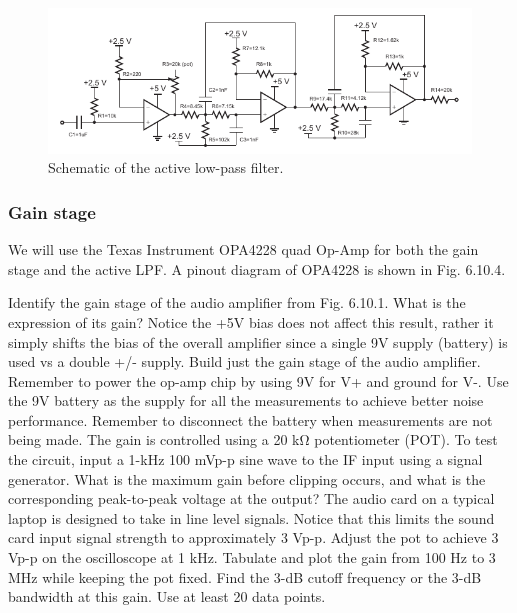 \documentclass[letterpaper, 11pt]{article}
\begin{document}
\begin{figure}
	\centering
	\includegraphics{lpf_sch}
	\caption{Schematic of the active low-pass filter.}
	\label{fig:lpf_pic}
\end{figure}


\subsubsection{Gain stage}

We will use the Texas Instrument OPA4228 quad Op-Amp for both the gain stage and the active LPF. A pinout diagram of OPA4228 is shown in Fig. 6.10.4.

Identify the gain stage of the audio amplifier from Fig. 6.10.1. What is the expression of its gain? Notice the +5V bias does not affect this result, rather it simply shifts the bias of the overall amplifier since a single 9V supply (battery) is used vs a double +/- supply.
Build just the gain stage of the audio amplifier. Remember to power the op-amp chip by using 9V for V+ and ground for V-. Use the 9V battery as the supply for all the measurements to achieve better noise performance. Remember to disconnect the battery when measurements are not being made.
The gain is controlled using a 20 kΩ potentiometer (POT). To test the circuit, input a 1-kHz 100 mVp-p sine wave to the IF input using a signal generator. What is the maximum gain before clipping occurs, and what is the corresponding peak-to-peak voltage at the output?
The audio card on a typical laptop is designed to take in line level signals. Notice that this limits the sound card input signal strength to approximately 3 Vp-p. Adjust the pot to achieve 3 Vp-p on the oscilloscope at 1 kHz. Tabulate and plot the gain from 100 Hz to 3 MHz while keeping the pot fixed. Find the 3-dB cutoff frequency or the 3-dB bandwidth at this gain. Use at least 20 data points.
\end{document}
